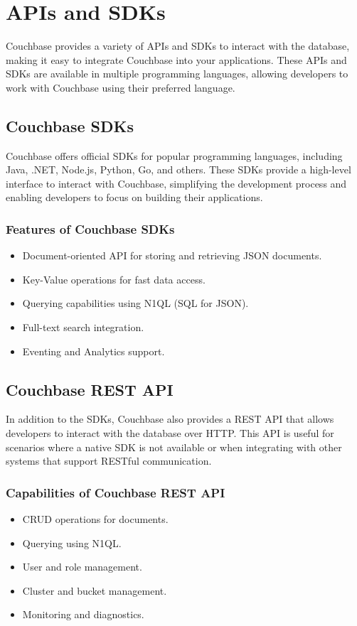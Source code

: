 \chapter{APIs and SDKs}

Couchbase provides a variety of APIs and SDKs to interact with the database, making it easy to integrate Couchbase into your applications. These APIs and SDKs are available in multiple programming languages, allowing developers to work with Couchbase using their preferred language.

\section{Couchbase SDKs}
Couchbase offers official SDKs for popular programming languages, including Java, .NET, Node.js, Python, Go, and others. These SDKs provide a high-level interface to interact with Couchbase, simplifying the development process and enabling developers to focus on building their applications.

\subsection{Features of Couchbase SDKs}
\begin{itemize}
  \item Document-oriented API for storing and retrieving JSON documents.
  \item Key-Value operations for fast data access.
  \item Querying capabilities using N1QL (SQL for JSON).
  \item Full-text search integration.
  \item Eventing and Analytics support.
\end{itemize}


\section{Couchbase REST API}
In addition to the SDKs, Couchbase also provides a REST API that allows developers to interact with the database over HTTP. This API is useful for scenarios where a native SDK is not available or when integrating with other systems that support RESTful communication.

\subsection{Capabilities of Couchbase REST API}
\begin{itemize}
  \item CRUD operations for documents.
  \item Querying using N1QL.
  \item User and role management.
  \item Cluster and bucket management.
  \item Monitoring and diagnostics.
\end{itemize}
